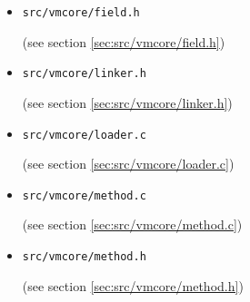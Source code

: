 \documentclass[a4paper, 10pt, titlepage]{scrartcl} %
\begin{document}
\begin{itemize}
 \item \begin{scriptsize}\verb|src|\hspace{0.0pt}\verb|/|\hspace{0.0pt}\verb|vmcore|\hspace{0.0pt}\verb|/|\hspace{0.0pt}\verb|field|\hspace{0.0pt}\verb|.|\hspace{0.0pt}\verb|h|\end{scriptsize} (see section \ref{sec:src/vmcore/field.h})
 \item \begin{scriptsize}\verb|src|\hspace{0.0pt}\verb|/|\hspace{0.0pt}\verb|vmcore|\hspace{0.0pt}\verb|/|\hspace{0.0pt}\verb|linker|\hspace{0.0pt}\verb|.|\hspace{0.0pt}\verb|h|\end{scriptsize} (see section \ref{sec:src/vmcore/linker.h})
 \item \begin{scriptsize}\verb|src|\hspace{0.0pt}\verb|/|\hspace{0.0pt}\verb|vmcore|\hspace{0.0pt}\verb|/|\hspace{0.0pt}\verb|loader|\hspace{0.0pt}\verb|.|\hspace{0.0pt}\verb|c|\end{scriptsize} (see section \ref{sec:src/vmcore/loader.c})
 \item \begin{scriptsize}\verb|src|\hspace{0.0pt}\verb|/|\hspace{0.0pt}\verb|vmcore|\hspace{0.0pt}\verb|/|\hspace{0.0pt}\verb|method|\hspace{0.0pt}\verb|.|\hspace{0.0pt}\verb|c|\end{scriptsize} (see section \ref{sec:src/vmcore/method.c})
 \item \begin{scriptsize}\verb|src|\hspace{0.0pt}\verb|/|\hspace{0.0pt}\verb|vmcore|\hspace{0.0pt}\verb|/|\hspace{0.0pt}\verb|method|\hspace{0.0pt}\verb|.|\hspace{0.0pt}\verb|h|\end{scriptsize} (see section \ref{sec:src/vmcore/method.h})

\end{itemize}
\end{document}
